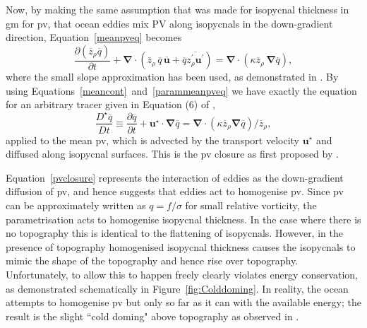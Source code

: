 \documentclass[12pt,a4paper]{report}
\newcommand*\mean[1]{\overline{#1}}
\newcommand*\res[1]{{#1}^{\prime}}
\newcommand*\figref[1]{Figure~\ref{#1}}
\newcommand*\equref[1]{Equation~\eqref{#1}}
\begin{document}
                Now, by making the same assumption that was made for isopycnal thickness in 
                \gls{gm} for \gls{pv}, that ocean eddies mix PV along isopycnals in the down-gradient direction, \equref{meanpveq} becomes
                \begin{equation}
                \frac{\partial \left(\mean{z}_{\rho} \mean{q}\right)}{\partial t} +
                \boldsymbol{\nabla}\cdot\left(\mean{z}_{\rho}\,\mean{q}\,\mean{\boldsymbol{u}}+\mean{q}\mean{\res{z}_{\rho} \res{\boldsymbol{u}}}\right)
                = \boldsymbol{\nabla}\cdot\left(\kappa \mean{z}_{\rho}\,\boldsymbol{\nabla}\mean{q}\right) ,
                \label{parammeanpveq}
                \end{equation}
                where the small slope approximation has been used, as demonstrated in
                \cite{gent1990}. By using Equations~\eqref{meancont}~and~\eqref{parammeanpveq} we have exactly the equation for an arbitrary tracer given in Equation (6) of \cite{gent1995parameterizing},
                \begin{equation}
                \frac{D^\star \mean{q}}{D t}\equiv\frac{\partial \mean{q}}{\partial t} + \boldsymbol{u}^\star\cdot\boldsymbol{\nabla}\mean{q} = \boldsymbol{\nabla}\cdot
                \left(\kappa \mean{z}_{\rho}\boldsymbol{\nabla} \mean{q} \right)/\mean{z}_{\rho} ,
                \label{pvclosure}
                \end{equation}
                applied to the mean \gls{pv}, which is advected by the transport velocity $\boldsymbol{u}^\star$ and diffused along isopycnal surfaces. This is 
                the \gls{pv} closure as first proposed by \cite{greatbatch1998exploring}.
                
                \equref{pvclosure} represents the interaction of eddies as the
                down-gradient diffusion of \gls{pv}, and hence suggests that eddies
                act to homogenise \gls{pv}. Since \gls{pv} can be approximately written
                as $q=f/\sigma$ for small relative vorticity, the parametrisation acts  to homogenise isopycnal thickness. In the case 
                where there is no topography this is identical to the flattening of isopycnals.
                However, in the presence of topography homogenised isopycnal thickness
                causes the isopycnals to mimic the shape of the topography and hence 
                rise over topography. Unfortunately, to allow this to happen freely
                clearly violates energy conservation, as demonstrated schematically in 
                \figref{fig:Colddoming}. In reality, the ocean attempts to 
                homogenise \gls{pv} but only so far as it can with the available energy;
                the result is the slight ``cold doming" above topography as observed in
                \cite{adcock2000interactions}. 
                
\end{document}
